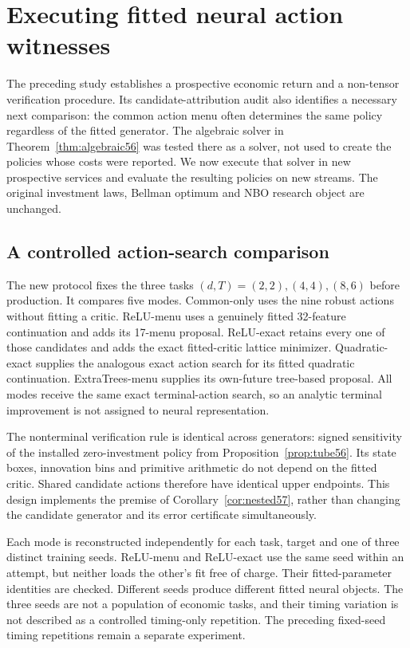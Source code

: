 \section{Executing fitted neural action witnesses}\label{sec:study57}
The preceding study establishes a prospective economic return and a non-tensor verification procedure. Its candidate-attribution audit also identifies a necessary next comparison: the common action menu often determines the same policy regardless of the fitted generator. The algebraic solver in Theorem~\ref{thm:algebraic56} was tested there as a solver, not used to create the policies whose costs were reported. We now execute that solver in new prospective services and evaluate the resulting policies on new streams. The original investment laws, Bellman optimum and NBO research object are unchanged.

\subsection{A controlled action-search comparison}
The new protocol fixes the three tasks $(d,T)=(2,2),(4,4),(8,6)$ before production. It compares five modes. Common-only uses the nine robust actions without fitting a critic. ReLU-menu uses a genuinely fitted 32-feature continuation and adds its 17-menu proposal. ReLU-exact retains every one of those candidates and adds the exact fitted-critic lattice minimizer. Quadratic-exact supplies the analogous exact action search for its fitted quadratic continuation. ExtraTrees-menu supplies its own-future tree-based proposal. All modes receive the same exact terminal-action search, so an analytic terminal improvement is not assigned to neural representation.

The nonterminal verification rule is identical across generators: signed sensitivity of the installed zero-investment policy from Proposition~\ref{prop:tube56}. Its state boxes, innovation bins and primitive arithmetic do not depend on the fitted critic. Shared candidate actions therefore have identical upper endpoints. This design implements the premise of Corollary~\ref{cor:nested57}, rather than changing the candidate generator and its error certificate simultaneously.

Each mode is reconstructed independently for each task, target and one of three distinct training seeds. ReLU-menu and ReLU-exact use the same seed within an attempt, but neither loads the other's fit free of charge. Their fitted-parameter identities are checked. Different seeds produce different fitted neural objects. The three seeds are not a population of economic tasks, and their timing variation is not described as a controlled timing-only repetition. The preceding fixed-seed timing repetitions remain a separate experiment.


